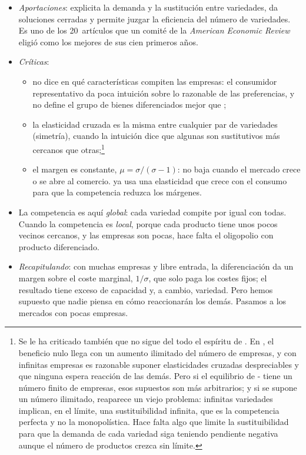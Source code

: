 \documentclass[11pt]{article}
\begin{document}
\begin{itemize}
\item \emph{Aportaciones}: explicita la demanda y la sustitución entre variedades, da soluciones cerradas y permite juzgar la eficiencia del número de variedades. Es uno de los 20~artículos que un comité de la \emph{American Economic Review} eligió como los mejores de sus cien primeros años\nocite{ArrowEtAl2011Top20}.
\item \emph{Críticas}:
  \begin{itemize}
  \item no dice en qué características compiten las empresas: el consumidor representativo da poca intuición sobre lo razonable de las preferencias, y no define el grupo de bienes diferenciados mejor que ;
  \item la elasticidad cruzada es la misma entre cualquier par de variedades (simetría), cuando la intuición dice que algunas son sustitutivos más cercanos que otras;\footnote{Se le ha criticado también que no sigue del todo el espíritu de . En , el beneficio nulo llega con un aumento ilimitado del número de empresas, y con infinitas empresas es razonable suponer elasticidades cruzadas despreciables y que ninguna espera reacción de las demás. Pero si el equilibrio de - tiene un número finito de empresas, esos supuestos son más arbitrarios; y si se supone un número ilimitado, reaparece un viejo problema: infinitas variedades implican, en el límite, una sustituibilidad infinita, que es la competencia perfecta y no la monopolística. Hace falta algo que limite la sustituibilidad para que la demanda de cada variedad siga teniendo pendiente negativa aunque el número de productos crezca sin límite.}
  \item el margen es constante, $\mu=\sigma/(\sigma-1)$: no baja cuando el mercado crece o se abre al comercio. \textcite{Krugman1979Increasing} ya usa una elasticidad que crece con el consumo para que la competencia reduzca los márgenes.
  \end{itemize}
\item La competencia es aquí \emph{global}: cada variedad compite por igual con todas. Cuando la competencia es \emph{local}, porque cada producto tiene unos pocos vecinos cercanos, y las empresas son pocas, hace falta el oligopolio con producto diferenciado.
\end{itemize}

\begin{itemize}
\item \emph{Recapitulando}: con muchas empresas y libre entrada, la diferenciación da un margen sobre el coste marginal, $1/\sigma$, que solo paga los costes fijos; el resultado tiene exceso de capacidad y, a cambio, variedad. Pero hemos supuesto que nadie piensa en cómo reaccionarán los demás. Pasamos a los mercados con pocas empresas.
\end{itemize}
\end{document}
